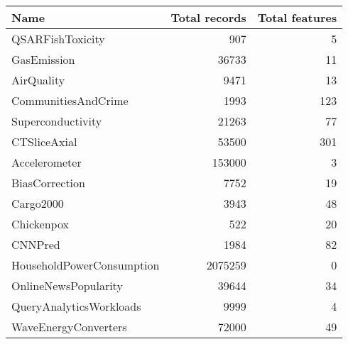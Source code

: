\begin{tabular}{lrr}
\toprule
                     Name &  Total records &  Total features \\
\midrule
         QSARFishToxicity &            907 &               5 \\
              GasEmission &          36733 &              11 \\
               AirQuality &           9471 &              13 \\
      CommunitiesAndCrime &           1993 &             123 \\
        Superconductivity &          21263 &              77 \\
             CTSliceAxial &          53500 &             301 \\
            Accelerometer &         153000 &               3 \\
           BiasCorrection &           7752 &              19 \\
                Cargo2000 &           3943 &              48 \\
               Chickenpox &            522 &              20 \\
                  CNNPred &           1984 &              82 \\
HouseholdPowerConsumption &        2075259 &               0 \\
     OnlineNewsPopularity &          39644 &              34 \\
  QueryAnalyticsWorkloads &           9999 &               4 \\
     WaveEnergyConverters &          72000 &              49 \\
\bottomrule
\end{tabular}

